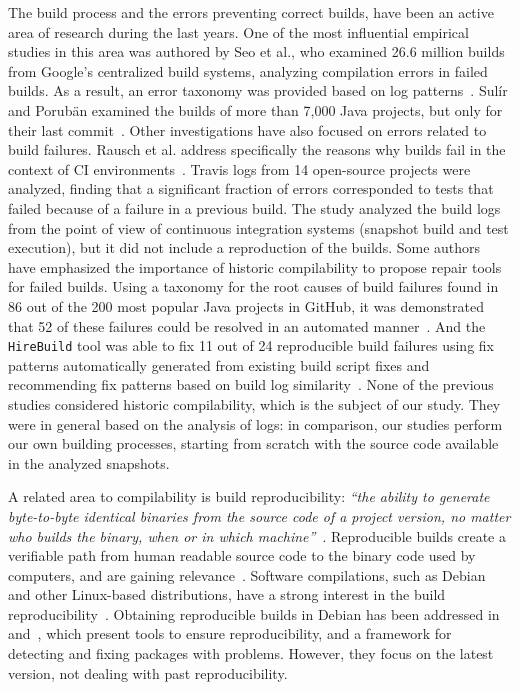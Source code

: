 The build process and the errors preventing correct builds, have been an active area of research during the last years.
One of the most influential empirical studies in this area was authored by Seo et al., who examined 26.6 million builds from Google's centralized build systems, analyzing compilation errors in failed builds. As a result, an error taxonomy was provided based on log patterns~\cite{Seo:2014:PBE:2568225.2568255}.
Sulír and Porubän examined the builds of more than 7,000 Java projects, but only for their last commit~\cite{Sulir:2016:QSJ:3001878.3001882}. 
Other investigations have also focused on errors related to build failures. 
Rausch et al. address specifically the reasons why builds fail in the context of CI environments~\cite{Rausch:2017:EAB:3104188.3104231}.
Travis logs from 14 open-source projects were analyzed, finding that a significant fraction of errors corresponded to tests that failed because of a failure in a previous build.
The study analyzed the build logs from the point of view of continuous integration systems (snapshot build and test execution), but it did not include a reproduction of the builds.
Some authors have emphasized the importance of historic compilability to propose repair tools for failed builds.
Using a taxonomy for the root causes of build failures found in 86 out of the 200 most popular Java projects in GitHub, it was demonstrated that 52 of these failures could be resolved in an automated manner~\cite{hassan2017automatic}.
And the \texttt{HireBuild} tool was able to fix 11 out of 24 reproducible build failures using fix patterns automatically generated from existing build script fixes and recommending fix patterns based on build log similarity~\cite{HireBuild}.
None of the previous studies considered historic compilability, which is the subject of our study. They were in general based on the analysis of logs: in comparison, our studies perform our own building processes, starting from scratch with the source code available in the analyzed snapshots.

A related area to compilability is build reproducibility: \emph{``the ability to generate byte-to-byte identical binaries from the source code of a project version, no matter who builds the binary, when or in which machine''}~\cite{RepBldsDebian:2018:Online}. 
Reproducible builds create a verifiable path from human readable source code to the binary code used by computers, and are gaining relevance~\cite{cito2017empirical,maudoux2018correct,deCarnedeCarnavalet:2014:CIV:2664243.2664288,perry2014reproducible}. 
Software compilations, such as Debian and other Linux-based distributions, have a strong interest in the build reproducibility~\cite{RepBlds:2017:Online,RepBldsDebian:2018:Online}. Obtaining reproducible builds in Debian has been addressed in~\cite{Glukhova:Thesis:2017} and~\cite{Ren:2018:ALU:3180155.3180224}, which present tools to ensure reproducibility, and a framework for detecting and fixing packages with problems. 
However, they focus on the latest version, not dealing with past reproducibility.

